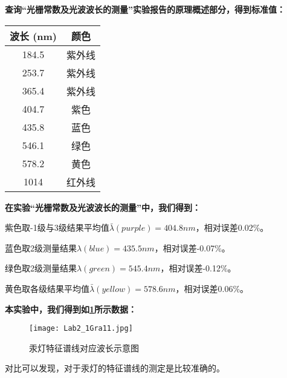 \documentclass[dvipsnames, svgnames,a4paper,11pt]{article}
\begin{document}
	\textbf{查询“光栅常数及光波波长的测量”实验报告的原理概述部分，得到标准值：}
	
	\begin{center}
		\begin{tabular}{|c|c|}
			\hline
			波长 (nm) & 颜色 \\
			\hline
			184.5 & 紫外线 \\
			253.7 & 紫外线 \\
			365.4 & 紫外线 \\
			404.7 & 紫色 \\
			435.8 & 蓝色 \\
			546.1 & 绿色 \\
			578.2 & 黄色 \\
			1014 & 红外线 \\
			\hline
		\end{tabular}
	\end{center}
	
	\textbf{在实验“光栅常数及光波波长的测量”中，我们得到：}
	
	紫色取-1级与3级结果平均值$\bar{\lambda}(purple)=404.8nm$，相对误差0.02\%。
	
	蓝色取2级测量结果$\lambda(blue)=435.5nm$，相对误差-0.07\%。
	
	绿色取2级测量结果$\lambda(green)=545.4nm$，相对误差-0.12\%。
	
	黄色取各级结果平均值$\bar{\lambda}(yellow)=578.6nm$，相对误差0.06\%。
	
	\textbf{本实验中，我们得到如\cref{fig:fig11}所示数据：}
	
	\begin{figure}[htbp]
		\centering
		\texttt{[image: Lab2\_1Gra11.jpg]}
		\caption{汞灯特征谱线对应波长示意图}
		\label{fig:fig11}
	\end{figure}
	
	对比可以发现，对于汞灯的特征谱线的测定是比较准确的。
	
\end{document}
